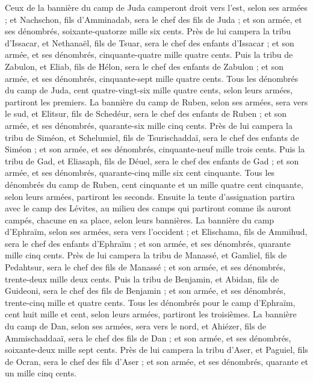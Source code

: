 \begin{multicols}{2}
Ceux de la bannière du camp de Juda camperont droit vers l'est, selon ses armées ; et Nachschon, fils d'Amminadab, sera le chef des fils de Juda ;
et son armée, et ses dénombrés, soixante-quatorze mille six cents.
Près de lui campera la tribu d'Issacar, et Nethanaël, fils de Tsuar, sera le chef des enfants d'Issacar ;
et son armée, et ses dénombrés, cinquante-quatre mille quatre cents.
Puis la tribu de Zabulon, et Eliab, fils de Hélon, sera le chef des enfants de Zabulon ;
et son armée, et ses dénombrés, cinquante-sept mille quatre cents.
Tous les dénombrés du camp de Juda, cent quatre-vingt-six mille quatre cents, selon leurs armées, partiront les premiers.
La bannière du camp de Ruben, selon ses armées, sera vers le sud, et Elitsur, fils de Schedéur, sera le chef des enfants de Ruben ;
et son armée, et ses dénombrés, quarante-six mille cinq cents.
Près de lui campera la tribu de Siméon, et Schelumiel, fils de Tsurischaddaï, sera le chef des enfants de Siméon ;
et son armée, et ses dénombrés, cinquante-neuf mille trois cents.
Puis la tribu de Gad, et Eliasaph, fils de Déuel, sera le chef des enfants de Gad ;
et son armée, et ses dénombrés, quarante-cinq mille six cent cinquante.
Tous les dénombrés du camp de Ruben, cent cinquante et un mille quatre cent cinquante, selon leurs armées, partiront les seconds.
Ensuite la tente d'assignation partira avec le camp des Lévites, au milieu des camps qui partiront comme ils auront campés, chacune en sa place, selon leurs bannières.
La bannière du camp d'Ephraïm, selon ses armées, sera vers l'occident ; et Elischama, fils de Ammihud, sera le chef des enfants d'Ephraïm ;
et son armée, et ses dénombrés, quarante mille cinq cents.
Près de lui campera la tribu de Manassé, et Gamliel, fils de Pedahtsur, sera le chef des fils de Manassé ;
et son armée, et ses dénombrés, trente-deux mille deux cents.
Puis la tribu de Benjamin, et Abidan, fils de Guideoni, sera le chef des fils de Benjamin ;
et son armée, et ses dénombrés, trente-cinq mille et quatre cents.
Tous les dénombrés pour le camp d'Ephraïm, cent huit mille et cent, selon leurs armées, partiront les troisièmes.
La bannière du camp de Dan, selon ses armées, sera vers le nord, et Ahiézer, fils de Ammischaddaaï, sera le chef des fils de Dan ;
et son armée, et ses dénombrés, soixante-deux mille sept cents.
Près de lui campera la tribu d'Aser, et Paguiel, fils de Ocran, sera le chef des fils d'Aser ;
et son armée, et ses dénombrés, quarante et un mille cinq cents.

\end{multicols}
